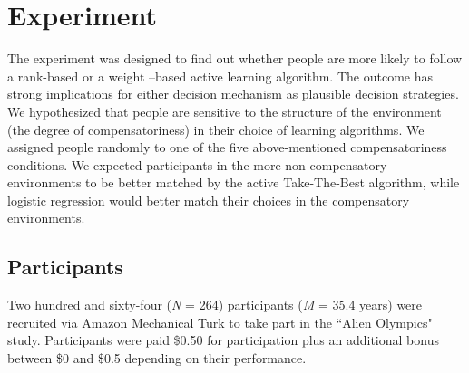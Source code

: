 \documentclass[10pt,letterpaper]{article}
\begin{document}
\section{Experiment}
The experiment was designed to find out whether people are more likely to follow a rank-based or a weight –based active learning algorithm. The outcome has strong implications for either decision mechanism as plausible decision strategies. We hypothesized that people are sensitive to the structure of the environment (the degree of compensatoriness) in their choice of learning algorithms. We assigned people randomly to one of the five above-mentioned compensatoriness conditions. We expected participants in the more non-compensatory environments to be better matched by the active Take-The-Best algorithm, while logistic regression would better match their choices in the compensatory environments.   

\subsection{Participants}
Two hundred and sixty-four (\textit{N} = 264) participants (\textit{M} = 35.4 years) were recruited via Amazon Mechanical Turk to take part in the ``Alien Olympics" study. Participants were paid \$0.50 for participation plus an additional bonus between \$0 and  \$0.5 depending on their performance. 
\end{document}
